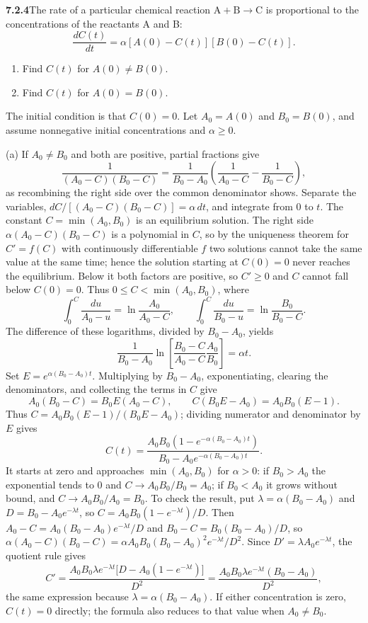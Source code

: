 \par\bigskip
\noindent\textbf{7.2.4}\quad The rate of a particular chemical reaction
$\mathrm{A}+\mathrm{B}\to\mathrm{C}$ is proportional to the concentrations of
the reactants A and B:
\[
\frac{dC(t)}{dt}=\alpha[A(0)-C(t)][B(0)-C(t)].
\]
\begin{enumerate}
\item[(a)] Find $C(t)$ for $A(0)\neq B(0)$.
\item[(b)] Find $C(t)$ for $A(0)=B(0)$.
\end{enumerate}
The initial condition is that $C(0)=0$.
\solution
Let $A_0=A(0)$ and $B_0=B(0)$, and assume nonnegative initial
concentrations and $\alpha\ge0$.

(a) If $A_0\ne B_0$ and both are positive, partial fractions give
\[
\frac1{(A_0-C)(B_0-C)}
=\frac1{B_0-A_0}\left(\frac1{A_0-C}-\frac1{B_0-C}\right),
\]
as recombining the right side over the common denominator shows.
Separate the variables, $dC/[(A_0-C)(B_0-C)]=\alpha\,dt$, and integrate
from $0$ to $t$. The constant $C=\min(A_0,B_0)$ is an equilibrium
solution. The right side $\alpha(A_0-C)(B_0-C)$ is a polynomial in $C$,
so by the uniqueness theorem for $C'=f(C)$ with continuously
differentiable $f$ two solutions cannot take the same value at the same
time; hence the solution starting at $C(0)=0$ never reaches the
equilibrium. Below it both factors are positive, so $C'\ge0$ and $C$
cannot fall below $C(0)=0$. Thus $0\le C<\min(A_0,B_0)$, where
\[
\int_0^C\frac{du}{A_0-u}=\ln\frac{A_0}{A_0-C},\qquad
\int_0^C\frac{du}{B_0-u}=\ln\frac{B_0}{B_0-C}.
\]
The difference of these logarithms, divided by $B_0-A_0$, yields
\[
\frac1{B_0-A_0}\ln\left[\frac{B_0-C}{A_0-C}\frac{A_0}{B_0}\right]
=\alpha t.
\]
Set $E=e^{\alpha(B_0-A_0)t}$. Multiplying by $B_0-A_0$, exponentiating,
clearing the denominators, and collecting the terms in $C$ give
\[
A_0(B_0-C)=B_0E(A_0-C),\qquad
C(B_0E-A_0)=A_0B_0(E-1).
\]
Thus $C=A_0B_0(E-1)/(B_0E-A_0)$; dividing numerator and denominator by
$E$ gives
\[
\boxed{C(t)=\frac{A_0B_0(1-e^{-\alpha(B_0-A_0)t})}
{B_0-A_0e^{-\alpha(B_0-A_0)t}}}.
\]
It starts at zero and approaches $\min(A_0,B_0)$ for $\alpha>0$: if
$B_0>A_0$ the exponential tends to $0$ and $C\to A_0B_0/B_0=A_0$; if
$B_0<A_0$ it grows without bound, and $C\to A_0B_0/A_0=B_0$.
To check the result, put $\lambda=\alpha(B_0-A_0)$ and
$D=B_0-A_0e^{-\lambda t}$, so $C=A_0B_0(1-e^{-\lambda t})/D$. Then
$A_0-C=A_0(B_0-A_0)e^{-\lambda t}/D$ and $B_0-C=B_0(B_0-A_0)/D$, so
$\alpha(A_0-C)(B_0-C)=\alpha A_0B_0(B_0-A_0)^2e^{-\lambda t}/D^2$.
Since $D'=\lambda A_0e^{-\lambda t}$, the quotient rule gives
\[
C'=\frac{A_0B_0\lambda e^{-\lambda t}\bigl[D-A_0(1-e^{-\lambda t})\bigr]}{D^2}
=\frac{A_0B_0\lambda e^{-\lambda t}(B_0-A_0)}{D^2},
\]
the same expression because $\lambda=\alpha(B_0-A_0)$.
If either concentration is zero, $C(t)=0$ directly; the formula also
reduces to that value when $A_0\ne B_0$.

